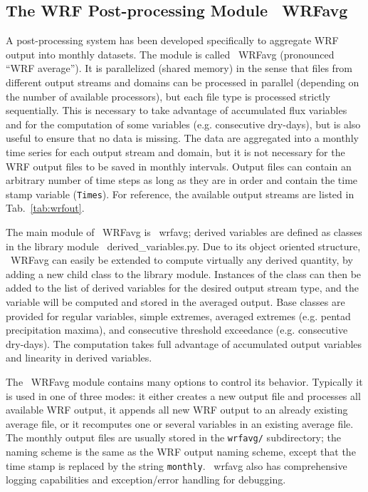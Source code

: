 \documentclass[letterpaper,12pt,headsepline,final]{scrartcl} %
\newcommand{\tab}[1]{Tab.~\ref{#1}}
\newcommand{\WRFavg}{\mbox{\color{blue} \sffamily WRFavg}}
\newcommand{\wrfavg}{\mbox{\color{blue} \ttfamily wrfavg}}
\newcommand{\derived}{\mbox{\color{magenta} \ttfamily derived\_variables.py}}
\begin{document}
\subsection{The WRF Post-processing Module \WRFavg{}}
\label{tool:avg}
A post-processing system has been developed specifically to aggregate WRF output into monthly datasets. The module is called \WRFavg{} (pronounced ``WRF average''). It is parallelized (shared memory) in the sense that files from different output streams and domains can be processed in parallel (depending on the number of available processors), but each file type is processed strictly sequentially. This is necessary to take advantage of accumulated flux variables and for the computation of some variables (e.g. consecutive dry-days), but is also useful to ensure that no data is missing.%
The data are aggregated into a monthly time series for each output stream and domain, but it is not necessary for the WRF output files to be saved in monthly intervals. Output files can contain an arbitrary number of time steps as long as they are in order and contain the time stamp variable (\texttt{Times}).
For reference, the available output streams are listed in \tab{tab:wrfout}.

The main module of \WRFavg{} is \wrfavg{}; derived variables are defined as classes in the library module \derived{}.
Due to its object oriented structure, \WRFavg{} can easily be extended to compute virtually any derived quantity, by adding a new child class to the library module.
Instances of the class can then be added to the list of derived variables for the desired output stream type, and the variable will be computed and stored in the averaged output.
Base classes are provided for regular variables, simple extremes, averaged extremes (e.g. pentad precipitation maxima), and consecutive threshold exceedance (e.g. consecutive dry-days). The computation takes full advantage of accumulated output variables and linearity in derived variables.

The \WRFavg{} module contains many options to control its behavior. Typically it is used in one of three modes: it either creates a new output file and processes all available WRF output, it appends all new WRF output to an already existing average file, or it recomputes one or several variables in an existing average file. The monthly output files are usually stored in the \texttt{wrfavg/} subdirectory; the naming scheme is the same as the WRF output naming scheme, except that the time stamp is replaced by the string \texttt{monthly}.
\wrfavg{} also has comprehensive logging capabilities and exception/error handling for debugging.
\end{document}
